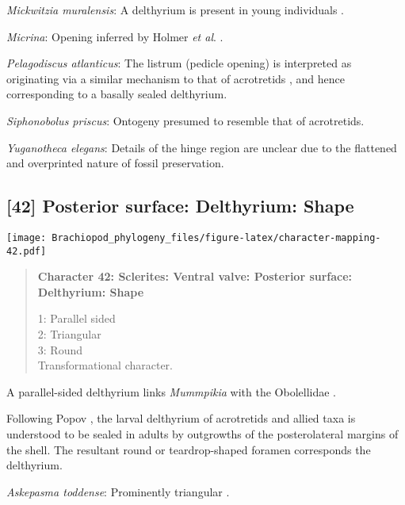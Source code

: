 \documentclass[openany]{book}
\theoremstyle{definition}
\theoremstyle{definition}
\theoremstyle{definition}
\theoremstyle{remark}
\begin{document}
\hypertarget{Mickwitzia_muralensis-coding-41}{}
\emph{Mickwitzia muralensis}: A delthyrium is present in young
individuals \citep{Balthasar2004Shellstructure}.

\hypertarget{Micrina-coding-41}{}
\emph{Micrina}: Opening inferred by Holmer \emph{et al}.
\citeyearpar{Holmer2008TheEarly}.

\hypertarget{Pelagodiscus_atlanticus-coding-41}{}
\emph{Pelagodiscus atlanticus}: The listrum (pedicle opening) is
interpreted as originating via a similar mechanism to that of
acrotretids \citep{Popov1992TheCambrian}, and hence corresponding to a
basally sealed delthyrium.

\hypertarget{Siphonobolus_priscus-coding-41}{}
\emph{Siphonobolus priscus}: Ontogeny presumed to resemble that of
acrotretids.

\hypertarget{Yuganotheca_elegans-coding-41}{}
\emph{Yuganotheca elegans}: Details of the hinge region are unclear due
to the flattened and overprinted nature of fossil preservation.

\subsection*{{[}42{]} Posterior surface: Delthyrium:
Shape}\label{posterior-surface-delthyrium-shape}

\texttt{[image: Brachiopod\_phylogeny\_files/figure-latex/character-mapping-42.pdf]}

\begin{quote}
\textbf{Character 42: Sclerites: Ventral valve: Posterior surface:
Delthyrium: Shape}

1: Parallel sided\\
2: Triangular\\
3: Round\\
Transformational character.
\end{quote}

A parallel-sided delthyrium links \emph{Mummpikia} with the Obolellidae
\citep{Balthasar2008iMummpikia}.

Following Popov \citeyearpar{Popov1992TheCambrian}, the larval
delthyrium of acrotretids and allied taxa is understood to be sealed in
adults by outgrowths of the posterolateral margins of the shell. The
resultant round or teardrop-shaped foramen corresponds the delthyrium.

\hypertarget{Askepasma_toddense-coding-42}{}
\emph{Askepasma toddense}: Prominently triangular \citep[see][fig.
2]{Topper2013Theoldest}.
\end{document}
